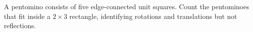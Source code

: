 A pentomino consists of five edge-connected unit squares. Count the pentominoes that fit inside a $2\times3$ rectangle, identifying rotations and translations but not reflections.
